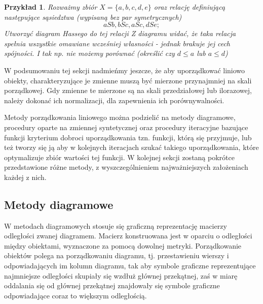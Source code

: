 \documentclass[12pt,a4paper]{report}
\newtheorem{example}{Przykład}
\begin{document}
\begin{example}
Rozważmy zbiór $X = \{a,b,c,d,e \}$ oraz relację definiującą następujące sąsiedztwa (wypisaną bez par symetrycznych) 
$$
aSb, bSc, aSc, dSe;
$$
{\color{red} Utworzyć diagram Hassego do tej relacji}
Z diagramu widać, że taka relacja spełnia wszystkie omawiane wcześniej własności - jednak brakuje jej cech spójności. I tak np. nie możemy porównać (określić czy $d \leq a$ lub $a \leq d$)
\end{example}


W podsumowaniu tej sekcji nadmieńmy jeszcze, że aby uporządkować liniowo obiekty, charakteryzujące je zmienne muszą być mierzone przynajmniej na skali porządkowej. Gdy zmienne te mierzone są na skali przedziałowej lub ilorazowej, należy dokonać ich normalizacji, dla zapewnienia ich porównywalności.

Metody porządkowania liniowego można podzielić na metody diagramowe, procedury oparte na zmiennej syntetycznej oraz procedury iteracyjne bazujące funkcji kryterium dobroci uporządkowania tzn. funkcji, którą się przyjmuje, lub też tworzy się ją aby w kolejnych iteracjach szukać takiego uporządkowania, które optymalizuje zbiór wartości tej funkcji. W kolejnej sekcji zostaną pokrótce przedstawione różne metody, z wyszczególnieniem najważniejszych założeniach każdej z nich.

\newpage
\subsection{Metody diagramowe}
\noindent

W metodach diagramowych stosuje się graficzną reprezentację macierzy odległości zwanej diagramem. Macierz konstruowana jest w oparciu o odległości między obiektami, wyznaczone za pomocą dowolnej metryki. Porządkowanie obiektów polega na porządkowaniu diagramu, tj. przestawieniu wierszy i odpowiadających im kolumn diagramu, tak aby symbole graficzne reprezentujące najmniejsze odległości skupiały się wzdłuż głównej przekątnej, zaś w miarę oddalania się od głównej przekątnej znajdowały się symbole graficzne odpowiadające coraz to większym odległością.  %
\end{document}
